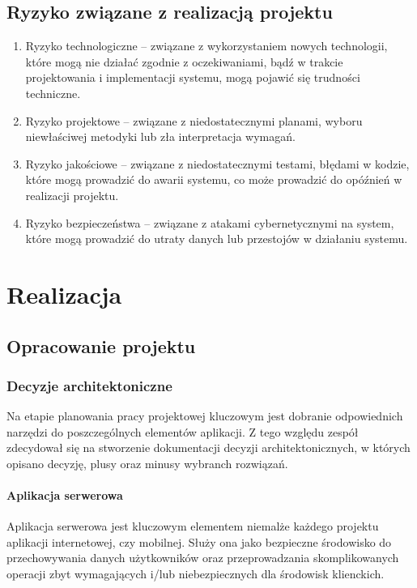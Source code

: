 \documentclass[12pt, a4paper, twoside, openany]{book}
\begin{document}
\section{Ryzyko związane z realizacją projektu}

\begin{enumerate}[label=--]
    \item Ryzyko technologiczne -- związane z wykorzystaniem nowych technologii, które mogą nie działać zgodnie z oczekiwaniami, bądź w trakcie projektowania i implementacji systemu, mogą pojawić się trudności techniczne.
    \item Ryzyko projektowe -- związane z niedostatecznymi planami, wyboru niewłaściwej metodyki lub zła interpretacja wymagań.
    \item Ryzyko jakościowe -- związane z niedostatecznymi testami, błędami w kodzie, które mogą prowadzić do awarii systemu, co może prowadzić do opóźnień w realizacji projektu.
    \item Ryzyko bezpieczeństwa -- związane z atakami cybernetycznymi na system, które mogą prowadzić do utraty danych lub przestojów w działaniu systemu.
\end{enumerate}

\chapter{Realizacja}

\section{Opracowanie projektu}

\subsection{Decyzje architektoniczne}

Na etapie planowania pracy projektowej kluczowym jest dobranie odpowiednich narzędzi
do poszczególnych elementów aplikacji. Z tego względu zespół zdecydował się na stworzenie
dokumentacji decyzji architektonicznych, w których opisano decyzję, plusy oraz minusy wybranch rozwiązań.

\subsubsection{Aplikacja serwerowa}

Aplikacja serwerowa jest kluczowym elementem niemalże każdego projektu aplikacji
internetowej, czy mobilnej. Służy ona jako bezpieczne środowisko do przechowywania danych
użytkowników oraz przeprowadzania skomplikowanych operacji zbyt wymagających i/lub
niebezpiecznych dla środowisk klienckich.
\end{document}
